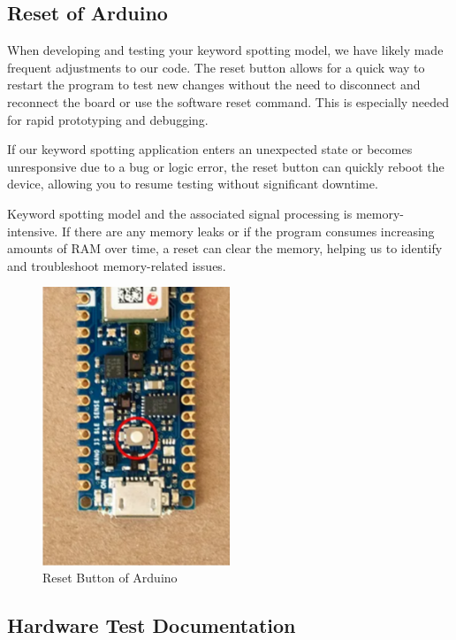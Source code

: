 \subsection{Reset of Arduino}

When developing and testing your keyword spotting model, we have likely made frequent adjustments to our code. The reset button allows for a quick way to restart the program to test new changes without the need to disconnect and reconnect the board or use the software reset command. This is especially needed for rapid prototyping and debugging.

If our keyword spotting application enters an unexpected state or becomes unresponsive due to a bug or logic error, the reset button can quickly reboot the device, allowing you to resume testing without significant downtime.

Keyword spotting model and the associated signal processing is memory-intensive. If there are any memory leaks or if the program consumes increasing amounts of RAM over time, a reset can clear the memory, helping us to identify and troubleshoot memory-related issues.

	\begin{figure}[h!]
	\centering
	\includegraphics[width=0.5\textwidth]{Images/testhardware/ResetButton}
	\caption{ Reset Button of Arduino} \label{fig:ResetButton}
	\end{figure}
	
\subsection{Hardware Test Documentation}	

